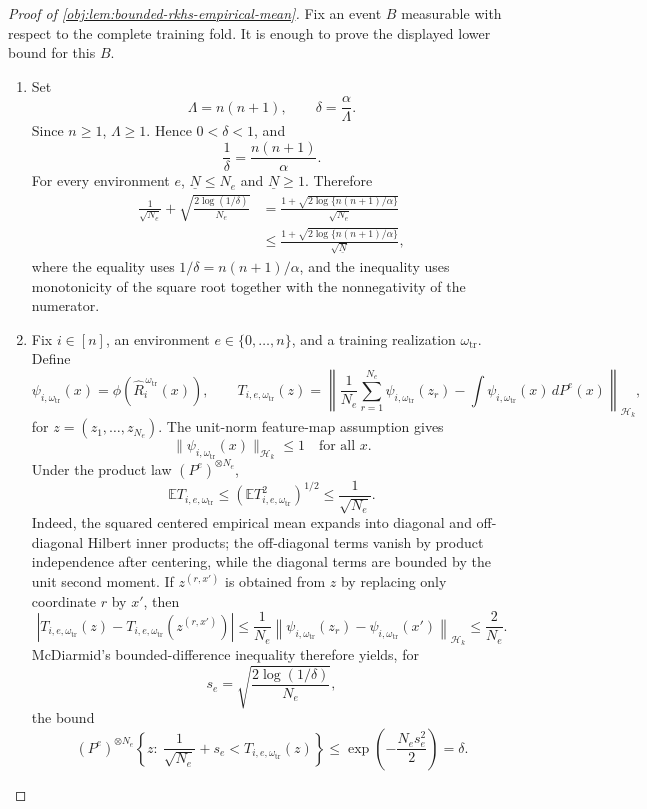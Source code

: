 \begin{proof}[Proof of \cref{obj:lem:bounded-rkhs-empirical-mean}]
Fix an event \(B\) measurable with respect to the complete training fold.  It is enough to prove the displayed lower bound for this \(B\).

\begin{enumerate}
\item Set
\[
\Lambda=n(n+1),\qquad
\delta=\frac{\alpha}{\Lambda}.
\]
Since \(n\ge 1\), \(\Lambda\ge 1\).  Hence \(0<\delta<1\), and
\[
\frac1\delta=\frac{n(n+1)}{\alpha}.
\]
For every environment \(e\), \(\underline N\le N_e\) and \(\underline N\ge 1\).  Therefore
\[
\begin{aligned}
\frac{1}{\sqrt{N_e}}
+\sqrt{\frac{2\log(1/\delta)}{N_e}}
&=
\frac{1+\sqrt{2\log\{n(n+1)/\alpha\}}}{\sqrt{N_e}}\\
&\le
\frac{1+\sqrt{2\log\{n(n+1)/\alpha\}}}{\sqrt{\underline N}},
\end{aligned}
\]
where the equality uses \(1/\delta=n(n+1)/\alpha\), and the inequality uses monotonicity of the square root together with the nonnegativity of the numerator. %

\item Fix \(i\in[n]\), an environment \(e\in\{0,\ldots,n\}\), and a training realization \(\omega_{\mathrm{tr}}\).  Define
\[
\psi_{i,\omega_{\mathrm{tr}}}(x)
=
\phi\!\left(\widehat R_i^{\,\omega_{\mathrm{tr}}}(x)\right),
\qquad
T_{i,e,\omega_{\mathrm{tr}}}(z)
=
\left\|
\frac1{N_e}\sum_{r=1}^{N_e}\psi_{i,\omega_{\mathrm{tr}}}(z_r)
-
\int \psi_{i,\omega_{\mathrm{tr}}}(x)\,dP^e(x)
\right\|_{\mathcal H_k},
\]
for \(z=(z_1,\ldots,z_{N_e})\).  The unit-norm feature-map assumption gives
\[
\|\psi_{i,\omega_{\mathrm{tr}}}(x)\|_{\mathcal H_k}\le 1
\quad\text{for all }x .
\]
Under the product law \((P^e)^{\otimes N_e}\),
\[
\mathbb E T_{i,e,\omega_{\mathrm{tr}}}
\le
\left(\mathbb E T_{i,e,\omega_{\mathrm{tr}}}^2\right)^{1/2}
\le
\frac1{\sqrt{N_e}}.
\]
Indeed, the squared centered empirical mean expands into diagonal and off-diagonal Hilbert inner products; the off-diagonal terms vanish by product independence after centering, while the diagonal terms are bounded by the unit second moment.  If \(z^{(r,x')}\) is obtained from \(z\) by replacing only coordinate \(r\) by \(x'\), then
\[
\left|
T_{i,e,\omega_{\mathrm{tr}}}(z)
-
T_{i,e,\omega_{\mathrm{tr}}}(z^{(r,x')})
\right|
\le
\frac1{N_e}
\left\|\psi_{i,\omega_{\mathrm{tr}}}(z_r)-\psi_{i,\omega_{\mathrm{tr}}}(x')\right\|_{\mathcal H_k}
\le
\frac2{N_e}.
\]
McDiarmid's bounded-difference inequality therefore yields, for
\[
s_e=\sqrt{\frac{2\log(1/\delta)}{N_e}},
\]
the bound
\[
(P^e)^{\otimes N_e}
\left\{
z:\ 
\frac1{\sqrt{N_e}}+s_e
<
T_{i,e,\omega_{\mathrm{tr}}}(z)
\right\}
\le
\exp\!\left(-\frac{N_e s_e^2}{2}\right)
=
\delta .
\]


\end{enumerate}
\end{proof}
